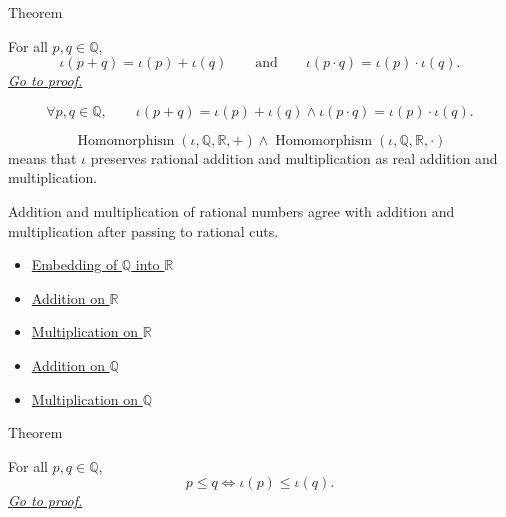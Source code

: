 \begin{theorembox}{Theorem}
\begin{theorem}
\label{thm:embedding-q-into-r-preserves-arithmetic}
For all $p,q\in\mathbb{Q}$,
\[
\iota(p+q)=\iota(p)+\iota(q)
\qquad\text{and}\qquad
\iota(p\cdot q)=\iota(p)\cdot\iota(q).
\]
\hyperref[prf:embedding-q-into-r-preserves-arithmetic]{\textit{Go to proof.}}
\end{theorem}
\end{theorembox}

\begin{remark*}
\[
\forall p,q\in\mathbb{Q},\qquad
\iota(p+q)=\iota(p)+\iota(q)
\land
\iota(p\cdot q)=\iota(p)\cdot\iota(q).
\]
\end{remark*}

\begin{remark*}
\[
\operatorname{Homomorphism}(\iota,\mathbb{Q},\mathbb{R},+)
\land
\operatorname{Homomorphism}(\iota,\mathbb{Q},\mathbb{R},\cdot)
\]
means that $\iota$ preserves rational addition and multiplication as real addition and multiplication.
\end{remark*}

\begin{remark*}[Interpretation]
Addition and multiplication of rational numbers agree with addition and multiplication after passing to rational cuts.
\end{remark*}

\begin{dependencies}
\begin{itemize}
  \item \hyperref[def:real-chapter-embedding-q-into-r]{Embedding of $\mathbb{Q}$ into $\mathbb{R}$}
  \item \hyperref[def:addition-on-r]{Addition on $\mathbb{R}$}
  \item \hyperref[def:multiplication-on-r]{Multiplication on $\mathbb{R}$}
  \item \hyperref[def:addition-on-q-classes]{Addition on $\mathbb{Q}$}
  \item \hyperref[def:multiplication-on-q-classes]{Multiplication on $\mathbb{Q}$}
\end{itemize}
\end{dependencies}

\begin{theorembox}{Theorem}
\begin{theorem}
\label{thm:embedding-q-into-r-preserves-order}
For all $p,q\in\mathbb{Q}$,
\[
p\le q \Longleftrightarrow \iota(p)\le\iota(q).
\]
\hyperref[prf:embedding-q-into-r-preserves-order]{\textit{Go to proof.}}
\end{theorem}
\end{theorembox}

